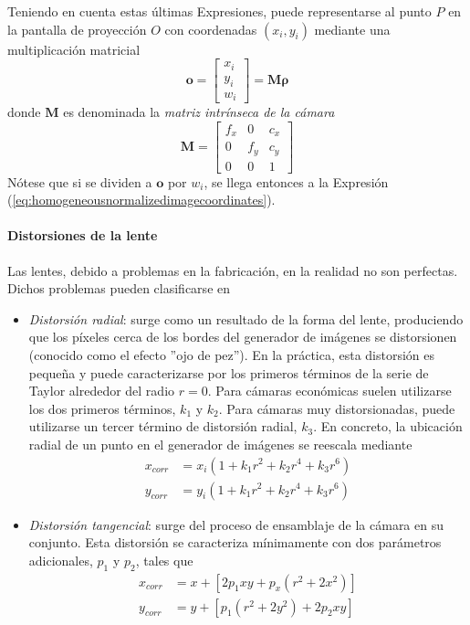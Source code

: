 Teniendo en cuenta estas últimas Expresiones, puede representarse al punto $P$ en la pantalla de proyección $O$ con coordenadas $(x_i,y_i)$ mediante una multiplicación matricial
\begin{equation}
    \bm{o}=
    \begin{bmatrix}
        x_i \\
        y_i \\
        w_i
    \end{bmatrix}
    =\bm{M}\bm{\rho}
\end{equation}
donde $\bm{M}$ es denominada la \textit{matriz intrínseca de la cámara}
\begin{equation}
    \bm{M} = 
    \begin{bmatrix}
        f_x & 0 & c_x \\
        0 & f_y & c_y \\
        0 & 0 & 1
    \end{bmatrix}
\end{equation}
Nótese que si se dividen a $\bm{o}$ por $w_i$, se llega entonces a la Expresión (\ref{eq:homogeneousnormalizedimagecoordinates}).

\paragraph{Distorsiones de la lente}
Las lentes, debido a problemas en la fabricación, en la realidad no son perfectas. Dichos problemas pueden clasificarse en
\begin{itemize}
    \item \textit{Distorsión radial}: surge como un resultado de la forma del lente, produciendo que los píxeles cerca de los bordes del generador de imágenes se distorsionen (conocido como el efecto ''ojo de pez''). En la práctica, esta distorsión es pequeña y puede caracterizarse por los primeros términos de la serie de Taylor alrededor del radio $r=0$. Para cámaras económicas suelen utilizarse los dos primeros términos, $k_1$ y $k_2$. Para cámaras muy distorsionadas, puede utilizarse un tercer término de distorsión radial, $k_3$. En concreto, la ubicación radial de un punto en el generador de imágenes se reescala mediante
        \begin{align}
            x_{corr} &= x_i (1 + k_1 r^2 + k_2 r^4 + k_3 r^6) \\
            y_{corr} & = y_i  (1 + k_1 r^2 + k_2 r^4 + k_3 r^6) 
        \end{align}
    \item \textit{Distorsión tangencial}: surge del proceso de ensamblaje de la cámara en su conjunto. Esta distorsión se caracteriza mínimamente con dos parámetros adicionales, $p_1$ y $p_2$, tales que
        \begin{align}
            x_{corr} &= x + \left[2p_1xy + p_x(r^2 + 2x^2)\right] \\
            y_{corr} &= y + \left[p_1(r^2+2y^2) + 2p_2xy\right]
        \end{align}
\end{itemize}

